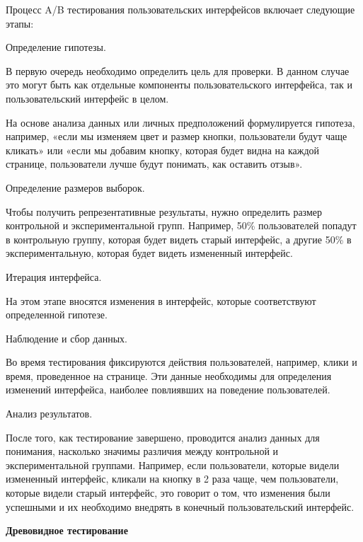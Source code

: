 Процесс A/B тестирования пользовательских интерфейсов включает следующие этапы:

\begin{textitemize}
	\item Определение гипотезы. 
	
	В первую очередь необходимо определить цель для проверки. В данном случае это могут быть как отдельные компоненты пользовательского интерфейса, так и пользовательский интерфейс в целом.
	
	На основе анализа данных или личных предположений формулируется гипотеза, например, «если мы изменяем цвет и размер кнопки, пользователи будут чаще кликать» или «если мы добавим кнопку, которая будет видна на каждой странице, пользователи лучше будут понимать, как оставить отзыв».
	
	\item Определение размеров выборок. 
	
	Чтобы получить репрезентативные результаты, нужно определить размер контрольной и экспериментальной групп. Например, 50\% пользователей попадут в контрольную группу, которая будет видеть старый интерфейс, а другие 50\% в экспериментальную, которая будет видеть измененный интерфейс.
	
	\item Итерация интерфейса. 
	
	На этом этапе вносятся изменения в интерфейс, которые соответствуют определенной гипотезе. 
	
	\item Наблюдение и сбор данных. 
	
	Во время тестирования фиксируются действия пользователей, например, клики и время, проведенное на странице. Эти данные необходимы для определения изменений интерфейса, наиболее повлиявших на поведение пользователей.
	
	\item Анализ результатов. 
	
	После того, как тестирование завершено, проводится анализ данных для понимания, насколько значимы различия между контрольной и экспериментальной группами. Например, если пользователи, которые видели измененный интерфейс, кликали на кнопку в 2 раза чаще, чем пользователи, которые видели старый интерфейс, это говорит о том, что изменения были успешными и их необходимо внедрять в конечный пользовательский интерфейс.
\end{textitemize}

\textbf{Древовидное тестирование}

